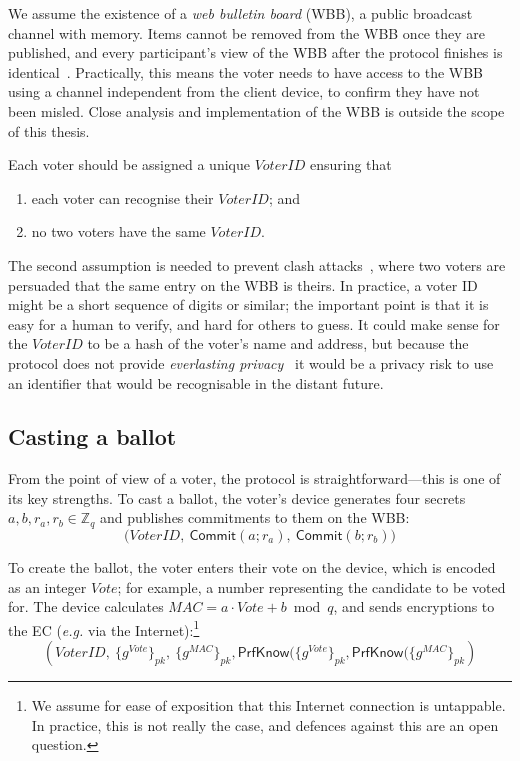 \documentclass[12pt,a4paper]{article}
\newcommand{\commit}{\mathsf{Commit}}
\newcommand{\PrfKnow}{\mathsf{PrfKnow}}
\theoremstyle{definition}
\newcommand{\Vote}{\mathit{Vote}}
\newcommand{\VoterID}{\mathit{VoterID}}
\newcommand{\Mac}{\mathit{MAC}}
\newcommand{\eg}{\textit{e.g. }}
\begin{document}
We assume the existence of a \textit{web bulletin board} (WBB), a public broadcast channel with memory. Items cannot be removed from the WBB once they are published, and every participant's view of the WBB after the protocol finishes is identical~\cite{culnane2014peered,hirschi2020fixing}. Practically, this means the voter needs to have access to the WBB using a channel independent from the client device, to confirm they have not been misled. Close analysis and implementation of the WBB is outside the scope of this thesis.

Each voter should be assigned a unique $\VoterID$ ensuring that
\begin{enumerate}
    \item each voter can recognise their $\VoterID$; and
    \item no two voters have the same $\VoterID$.
\end{enumerate}
The second assumption is needed to prevent clash attacks~\cite{kusters2012clash}, where two voters are persuaded that the same entry on the WBB is theirs. In practice, a voter ID might be a short sequence of digits or similar; the important point is that it is easy for a human to verify, and hard for others to guess. It could make sense for the $\VoterID$ to be a hash of the voter's name and address, but because the protocol does not provide \textit{everlasting privacy}~\cite{moran2006receipt} it would be a privacy risk to use an identifier that would be recognisable in the distant future.

\subsection{Casting a ballot}
From the point of view of a voter, the protocol is straightforward---this is one of its key strengths. To cast a ballot, the voter's device generates four secrets $a, b, r_a, r_b \in \mathbb{Z}_q$ and publishes commitments to them on the WBB:
$$\big(\VoterID,\ \commit(a;r_a),\ \commit(b;r_b)\big)$$

To create the ballot, the voter enters their vote on the device, which is encoded as an integer $\Vote$; for example, a number representing the candidate to be voted for. The device calculates $\Mac=a\cdot \Vote+b \bmod q$, and sends encryptions to the EC (\eg via the Internet):\footnote{We assume for ease of exposition that this Internet connection is untappable. In practice, this is not really the case, and defences against this are an open question.}
$$\left(\VoterID,\ \{g^{\Vote}\}_{pk},\ \{g^\Mac\}_{pk}, \PrfKnow(\{g^{\Vote}\}_{pk}, \PrfKnow(\{g^{\Mac}\}_{pk}\right)$$
\end{document}

